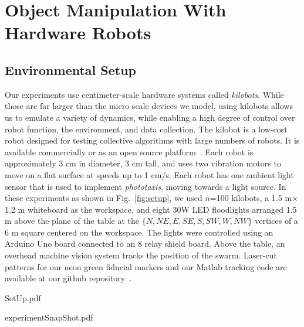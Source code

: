
\section{Object Manipulation With Hardware Robots}\label{sec:realExperiment}

  
\subsection{Environmental Setup}
Our experiments use centimeter-scale hardware systems called \emph{kilobots}.  While those are far larger than the micro scale devices we model, using kilobots allows us to emulate a variety of dynamics, while enabling a high degree of control over robot function, the environment, and data collection. The kilobot \cite{Rubenstein2012,rubenstein2014programmable} is a low-cost robot designed for testing collective algorithms with large numbers of robots. It is available commercially or as an open source platform~\cite{K-Team2015}.  Each robot is approximately 3 cm in diameter, 3 cm tall, and uses two vibration motors to move on a flat surface at speeds up to 1 cm/s.  Each robot has one ambient light sensor that is used to implement \emph{phototaxis},  moving towards a light source. 
In these experiments as shown in Fig.~\ref{fig:setup}, we used $n$=100 kilobots, a 1.5 m$\times$1.2 m whiteboard as the workspace, and eight 30W LED floodlights arranged 1.5 m above the plane of the table at the $\{N,NE,E,SE,S,SW,W,NW\}$ vertices of a 6 m square centered on the workspace. The lights were controlled using an Arduino Uno board connected to an 8 relay shield board.  Above the table, an overhead machine vision system tracks the position of the swarm. Laser-cut patterns for our neon green fiducial markers and our {\sc Matlab} tracking code are available at our github repository~\cite{Shahrokhi2015GitHubShapeControl}.
\begin{figure*}
\begin{center}
	\begin{overpic}[width=0.49\columnwidth]{SetUp.pdf}\end{overpic}
	\begin{overpic}[width=0.49\columnwidth]{experimentSnapShot.pdf}\end{overpic}
\end{center}

\caption{\label{fig:setup}
Hardware platform:  table with 1.5$\times$1.2 m workspace, surrounded by eight remotely triggered 30W LED floodlights, with an overhead machine vision system (Left). A swarm of robots, all controlled by a uniform force field, can be effectively controlled by a hybrid controller that knows only the first and second moments of the robot distribution.  Here is a swarm of hardware robots (kilobots) that pushes a green block toward the goal (Right). See video attachment~\cite{ShivaVideo2015}
}
\end{figure*}
